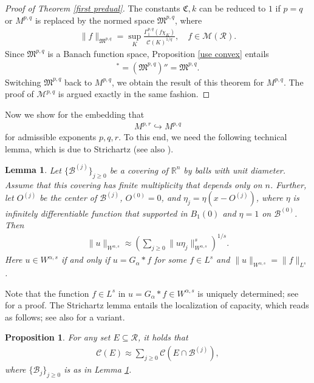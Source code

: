 \documentclass[10pt,reqno]{amsart}
\newtheorem{lemma}[theorem]{Lemma}
\newtheorem{proposition}[theorem]{Proposition}
\numberwithin{equation}{section}
\begin{document}
\begin{proof}[Proof of Theorem \ref{first predual}]
The constants $\mathfrak{C},k$ can be reduced to $1$ if $p=q$ or $M^{p,q}$ is replaced by the normed space $\mathfrak{M}^{p,q}$, where 
\begin{align*}
\|f\|_{\mathfrak{M}^{p,q}}=\sup_{K}\frac{\Gamma_{1}^{p,q}(f\chi_{K})}{\mathcal{C}(K)^{1/q}},\quad f\in\mathcal{M}(\mathcal{R}).
\end{align*}
Since $\mathfrak{M}^{p,q}$ is a Banach function space, Proposition \ref{use convex} entails
\begin{align*}
[(\mathfrak{M}^{p,q})']^{\ast}=(\mathfrak{M}^{p,q})''=\mathfrak{M}^{p,q}.
\end{align*}
Switching $\mathfrak{M}^{p,q}$ back to $M^{p,q}$, we obtain the result of this theorem for $M^{p,q}$. The proof of $\mathcal{M}^{p,q}$ is argued exactly in the same fashion. 
\end{proof}

Now we show for the embedding that
\begin{align*}
M^{p,r}\hookrightarrow M^{p,q}
\end{align*}
for admissible exponents $p,q,r$. To this end, we need the following technical lemma, which is due to Strichartz \cite{ST} (see also \cite[Theorem 3.1.2]{MS}).
\begin{lemma}\label{IVstr}
Let $\{\mathcal{B}^{(j)}\}_{j\geq 0}$ be a covering of $\mathbb{R}^{n}$ by balls with unit diameter. Assume that this covering has finite multiplicity that depends only on $n$. Further, let $O^{(j)}$ be the center of $\mathcal{B}^{(j)}$, $O^{(0)}=0$, and $\eta_{j}=\eta(x-O^{(j)})$, where $\eta$ is infinitely differentiable function that supported in $B_{1}(0)$ and $\eta=1$ on $\mathcal{B}^{(0)}$. Then
\begin{align*}
\|u\|_{W^{\alpha,s}}\approx\left(\sum_{j\geq 0}\|u\eta_{j}\|_{W^{\alpha,s}}^{s}\right)^{1/s}.
\end{align*}
Here $u\in W^{\alpha,s}$ if and only if $u=G_{\alpha}\ast f$ for some $f\in L^{s}$ and $\|u\|_{W^{\alpha,s}}=\|f\|_{L^{s}}$.
\end{lemma}

Note that the function $f\in L^{s}$ in $u=G_{\alpha}\ast f\in W^{\alpha,s}$ is uniquely determined; see \cite[Section 3.3]{SE} for a proof. The Strichartz lemma entails the localization of capacity, which reads as follows; see also \cite[Theorem 4]{AD} for a variant.
\begin{proposition}\label{IVSTR}
For any set $E\subseteq\mathcal{R}$, it holds that 
\begin{align}\label{IVSTRuse}
\mathcal{C}(E)\approx\sum_{j\geq 0}\mathcal{C}(E\cap\mathcal{B}^{(j)}),
\end{align}
where $\{\mathcal{B}_{j}\}_{j\geq 0}$ is as in Lemma \ref{IVstr}.
\end{proposition}
\end{document}
